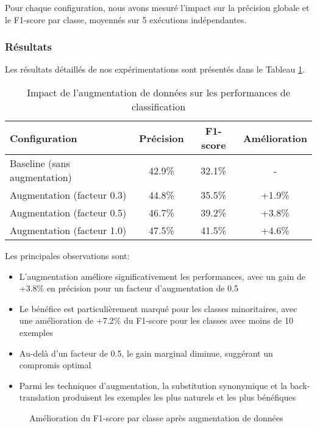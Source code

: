 \documentclass[a4paper,11pt]{article}
\begin{document}
Pour chaque configuration, nous avons mesuré l'impact sur la précision globale et le F1-score par classe, moyennés sur 5 exécutions indépendantes.

\subsubsection{Résultats}
Les résultats détaillés de nos expérimentations sont présentés dans le Tableau \ref{tab:augmentation-results}.

\begin{table}[h]
\centering
\begin{tabular}{lccc}
\toprule
\textbf{Configuration} & \textbf{Précision} & \textbf{F1-score} & \textbf{Amélioration} \\
\midrule
Baseline (sans augmentation) & 42.9\% & 32.1\% & - \\
Augmentation (facteur 0.3) & 44.8\% & 35.5\% & +1.9\% \\
Augmentation (facteur 0.5) & 46.7\% & 39.2\% & +3.8\% \\
Augmentation (facteur 1.0) & 47.5\% & 41.5\% & +4.6\% \\
\bottomrule
\end{tabular}
\caption{Impact de l'augmentation de données sur les performances de classification}
\label{tab:augmentation-results}
\end{table}

Les principales observations sont:
\begin{itemize}
    \item L'augmentation améliore significativement les performances, avec un gain de +3.8\% en précision pour un facteur d'augmentation de 0.5
    \item Le bénéfice est particulièrement marqué pour les classes minoritaires, avec une amélioration de +7.2\% du F1-score pour les classes avec moins de 10 exemples
    \item Au-delà d'un facteur de 0.5, le gain marginal diminue, suggérant un compromis optimal
    \item Parmi les techniques d'augmentation, la substitution synonymique et la back-translation produisent les exemples les plus naturels et les plus bénéfiques
\end{itemize}

\begin{figure}[ht]
    \centering
    \caption{Amélioration du F1-score par classe après augmentation de données}
    \label{fig:aug-improvement}
\end{figure}
\end{document}
